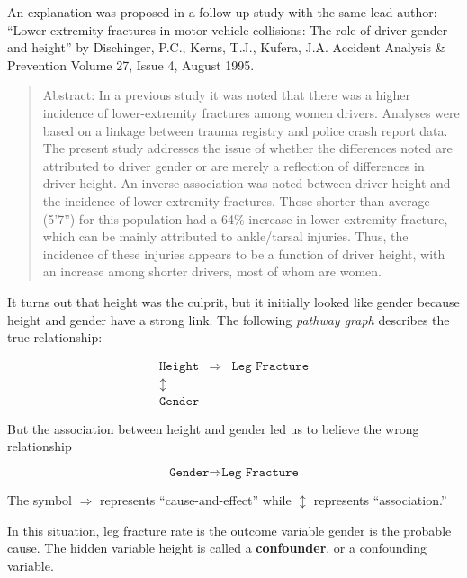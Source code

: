 \documentclass[11pt, chapterprefix=true]{scrbook}\usepackage[]{graphicx}\usepackage[]{color}
\begin{document}
An explanation was proposed in a follow-up study with the same lead author: ``Lower extremity fractures in motor vehicle collisions: The role of driver gender and height'' by Dischinger, P.C., Kerns, T.J., Kufera, J.A. Accident Analysis \& Prevention Volume 27, Issue 4, August 1995.

\begin{quotation}
Abstract: In a previous study it was noted that there was a higher incidence of lower-extremity fractures among women drivers. Analyses were based on a linkage between trauma registry and police crash report data. The present study addresses the issue of whether the differences noted are attributed to driver gender or are merely a reflection of differences in driver height. An inverse association was noted between driver height and the incidence of lower-extremity fractures. Those shorter than average (5'7'') for this population had a 64\% increase in lower-extremity fracture, which can be mainly attributed to ankle/tarsal injuries. Thus, the incidence of these injuries appears to be a function of driver height, with an increase among shorter drivers, most of whom are women.
\end{quotation}

It turns out that height was the culprit, but it initially looked like gender because height and gender have a strong link.  The following \textit{pathway graph} describes the true relationship:

\begin{eqnarray*}
\texttt{Height} & \Rightarrow & \texttt{Leg Fracture} \\
\updownarrow &  & \\
\texttt{Gender} & &
\end{eqnarray*}

But the association between height and gender led us to believe the wrong relationship

$$ \texttt{Gender} \Rightarrow  \texttt{Leg Fracture} $$

The symbol $\Rightarrow$ represents ``cause-and-effect'' while $\updownarrow$      represents ``association.''

In this situation, leg fracture rate is the outcome variable gender is the probable cause.  The hidden variable height is called a \textbf{confounder}, or a confounding variable.

\end{document}
